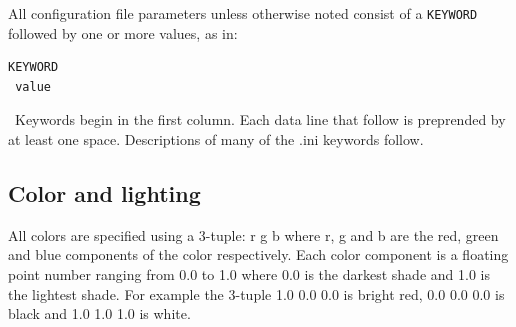 \documentclass[11pt,twoside]{book}
\begin{document}
All configuration file parameters unless otherwise noted consist of a {\tt KEYWORD}
followed by one or more values, as in:
\begin{lstlisting}
KEYWORD
 value
\end{lstlisting}
\ Keywords begin in the first column.
Each data line that follow is preprended by at least one space.
Descriptions of many of the .ini keywords follow.





\subsection{Color and lighting}
All colors are specified using a 3-tuple: r g b
where r, g and b are the red, green and blue components of the color respectively.
Each color component is a floating point number ranging
from 0.0 to 1.0 where 0.0 is the darkest shade and 1.0 is the
lightest shade.  For example the 3-tuple 1.0 0.0 0.0 is bright red, 0.0 0.0 0.0 is black and
1.0 1.0 1.0 is white.
\end{document}

